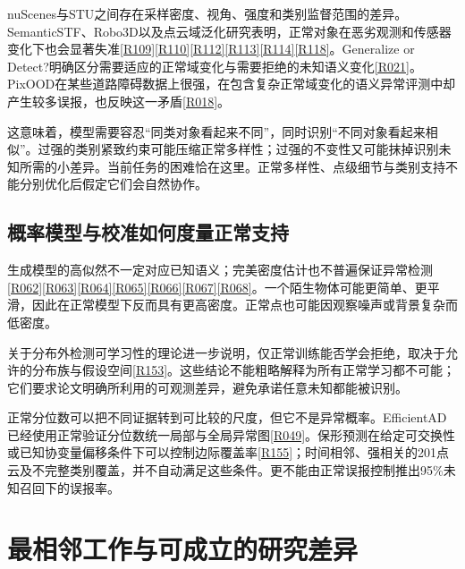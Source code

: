 \documentclass[11pt,a4paper]{article}
\newcommand{\paper}[1]{\allowbreak\hyperlink{#1}{[#1]}\allowbreak}
\begin{document}
nuScenes与STU之间存在采样密度、视角、强度和类别监督范围的差异。SemanticSTF、Robo3D以及点云域泛化研究表明，正常对象在恶劣观测和传感器变化下也会显著失准\paper{R109}\paper{R110}\paper{R112}\paper{R113}\paper{R114}\paper{R118}。Generalize or Detect?明确区分需要适应的正常域变化与需要拒绝的未知语义变化\paper{R021}。PixOOD在某些道路障碍数据上很强，在包含复杂正常域变化的语义异常评测中却产生较多误报，也反映这一矛盾\paper{R018}。

这意味着，模型需要容忍“同类对象看起来不同”，同时识别“不同对象看起来相似”。过强的类别紧致约束可能压缩正常多样性；过强的不变性又可能抹掉识别未知所需的小差异。当前任务的困难恰在这里。正常多样性、点级细节与类别支持不能分别优化后假定它们会自然协作。

\subsection{概率模型与校准如何度量正常支持}

生成模型的高似然不一定对应已知语义；完美密度估计也不普遍保证异常检测\paper{R062}\paper{R063}\paper{R064}\paper{R065}\paper{R066}\paper{R067}\paper{R068}。一个陌生物体可能更简单、更平滑，因此在正常模型下反而具有更高密度。正常点也可能因观察噪声或背景复杂而低密度。

关于分布外检测可学习性的理论进一步说明，仅正常训练能否学会拒绝，取决于允许的分布族与假设空间\paper{R153}。这些结论不能粗略解释为所有正常学习都不可能；它们要求论文明确所利用的可观测差异，避免承诺任意未知都能被识别。

正常分位数可以把不同证据转到可比较的尺度，但它不是异常概率。EfficientAD已经使用正常验证分位数统一局部与全局异常图\paper{R049}。保形预测在给定可交换性或已知协变量偏移条件下可以控制边际覆盖率\paper{R155}；时间相邻、强相关的201点云及不完整类别覆盖，并不自动满足这些条件。更不能由正常误报控制推出95\%未知召回下的误报率。

\section{最相邻工作与可成立的研究差异}
\end{document}
